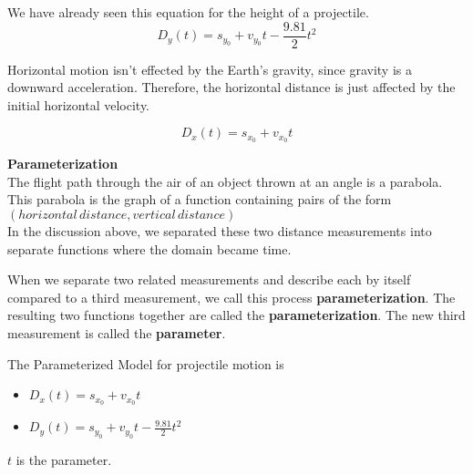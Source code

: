 \documentclass{ximera}
\begin{document}
We have already seen this equation for the height of a projectile.
\[ D_y(t) = s_{y_0} + v_{y_0} t - \frac{9.81}{2} t^2  \]

Horizontal motion isn't effected by the Earth's gravity, since gravity is a downward acceleration. Therefore, the horizontal distance is just affected by the initial horizontal velocity.


\[ D_x(t) = s_{x_0} + v_{x_0} t  \]






\begin{definition} \textbf{\textcolor{green!50!black}{Parameterization}} \\

The flight path through the air of an object thrown at an angle is a parabola.  This parabola is the graph of a function containing pairs of the form $(horizontal \, distance, vertical \,distance)$ \\

In the discussion above, we separated these two distance measurements into separate functions where the domain became time.



When we separate two related measurements and describe each by itself compared to a third measurement, we call this process \textbf{parameterization}.  The resulting two functions together are called the \textbf{parameterization}.  The new third measurement is called the \textbf{parameter}.





\begin{model} 


The Parameterized Model for projectile motion is


\begin{itemize}
\item $D_x(t) = s_{x_0} + v_{x_0} t$
\item $D_y(t) = s_{y_0} + v_{y_0} t - \frac{9.81}{2} t^2$
\end{itemize}

$t$ is the parameter.

\end{model}



\end{definition}
\end{document}
